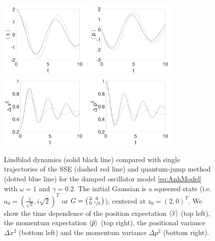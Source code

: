 \documentclass[12pt]{iopart} %
\begin{document}
\begin{figure}
  \centering
 	  \includegraphics[width=0.4\textwidth]{XSingleAnh.pdf}
	  \includegraphics[width=0.4\textwidth]{PSingleAnh.pdf}\\
	  \includegraphics[width=0.4\textwidth]{varXSingleAnh.pdf}
	  \includegraphics[width=0.4\textwidth]{varPSingleAnh.pdf}
\caption{  Lindblad dynamics (solid black line) compared with single trajectories of the SSE (dashed red line) and quantum-jump method (dotted blue line) for the damped oscillator model \cref{eq:AnhModel} with $\omega=1$ and $\gamma=0.2$. The initial Gaussian is a squeezed state (i.e. $a_0=(\tfrac{1}{\sqrt{2}}, i\sqrt{2})^T$ or $G=\left(\begin{smallmatrix}2&0\\0&\sfrac{1}{2}\end{smallmatrix}\right)$), centered at $ z_0=\left(2,0\right)^T$. We show the time dependence of the position expectation $\braket{\hat x}$ (top left), the momentum expectation $\braket{\hat p}$ (top right), the positional variance $\Delta x^2$ (bottom left) and the momentum variance $\Delta p ^2$ (bottom right).}\label{fig:SingleBehaviorAnh}
\end{figure}
\end{document}
